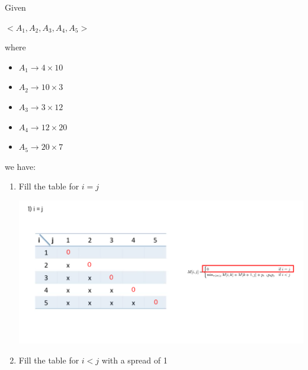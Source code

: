 \documentclass[12pt]{article}
\begin{document}
\begin{enumerate}[1.]
\begin{itemize}
\begin{itemize}
\begin{enumerate}[1.]
                Given

                $<A_1, A_2, A_3, A_4, A_5>$

                \bigskip

                where

                \begin{itemize}
                    \item $A_1 \to 4 \times 10$
                    \item $A_2 \to 10 \times 3$
                    \item $A_3 \to 3 \times 12$
                    \item $A_4 \to 12 \times 20$
                    \item $A_5 \to 20 \times 7$
                \end{itemize}

                \bigskip

                we have:

                \bigskip

                \begin{enumerate}[1)]
                    \item Fill the table for $i = j$

                    \begin{center}
                    \includegraphics[width=\linewidth]{images/worksheet_3_solution_2.png}
                    \end{center}

                    \item Fill the table for $i < j$ with a spread of 1


\end{enumerate}
\end{enumerate}
\end{itemize}
\end{itemize}
\end{enumerate}
\end{document}
